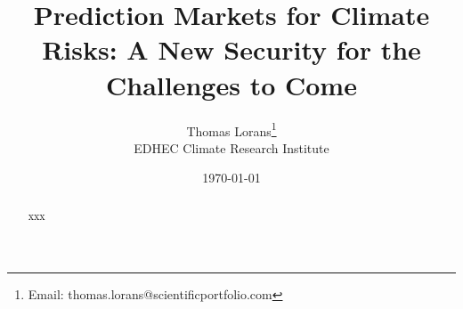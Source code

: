 \documentclass[12pt]{article}
\title{Prediction Markets for Climate Risks: A New Security for the Challenges to Come
}
\author{Thomas Lorans\thanks{Email: thomas.lorans@scientificportfolio.com} \\ EDHEC Climate Research Institute}
\date{\today}
\begin{document}
\maketitle

\begin{abstract}
  xxx
\end{abstract}

\newpage

\tableofcontents







\end{document}

